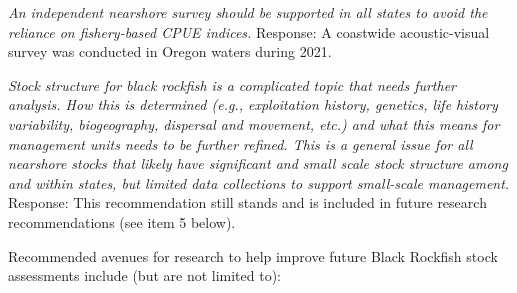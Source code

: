 \documentclass[11pt,
  english,
  letterpaper,
]{article}
\begin{document}
\textit{An independent nearshore survey should be supported in all states to avoid the reliance on fishery-based CPUE indices.} Response: A coastwide acoustic-visual survey was conducted in Oregon waters during 2021.

\textit{Stock structure for black rockfish is a complicated topic that needs further analysis. How this is determined (e.g., exploitation history, genetics, life history variability, biogeography, dispersal and movement, etc.) and what this means for management units needs to be further refined. This is a general issue for all nearshore stocks that likely have significant and small scale stock structure among and within states, but limited data collections to support small-scale management.} Response: This recommendation still stands and is included in future research recommendations (see item 5 below).

Recommended avenues for research to help improve future Black Rockfish stock assessments include (but are not limited to):
\end{document}

